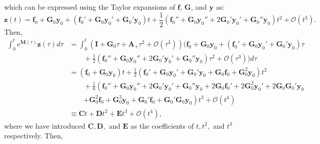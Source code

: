 which can be expressed using the Taylor expansions of $\mathbf{f}$, $\mathbf{G}$, and $\mathbf{y}$ as:
\begin{equation}
    \mathbf{z}(t) = \mathbf{f}_0 + \mathbf{G}_0\mathbf{y}_0 + \left(\mathbf{f}_0'+\mathbf{G}_0\mathbf{y}_0'+\mathbf{G}_0'\mathbf{y}_0\right)t + \frac{1}{2}\left(\mathbf{f}_0''+\mathbf{G}_0\mathbf{y}_0'' +2\mathbf{G}_0'\mathbf{y}_0'+\mathbf{G}_0''\mathbf{y}_0\right)t^2 + \mathcal{O}(t^3).
\end{equation}
Then, 
\begin{equation}
\begin{split}
    \int_{0}^t e^{\mathbf{M}(\tau)} \mathbf{z}(\tau) d \tau & = \int_{0}^t\left(
    \mathbf{I} + \mathbf{G}_0\tau+\mathbf{A}_{+}\tau^2 + \mathcal{O}(\tau^3)\right)\biggl(\mathbf{f}_0+\mathbf{G}_0\mathbf{y}_0 + \left(\mathbf{f}_0'+\mathbf{G}_0\mathbf{y}_0'  +\mathbf{G}_0'\mathbf{y}_0\right)\tau \\
    & \qquad  +\frac{1}{2}\left(\mathbf{f}_0''+\mathbf{G}_0\mathbf{y}_0''+2\mathbf{G}_0'\mathbf{y}_0'+\mathbf{G}_0''\mathbf{y}_0\right)\tau^2 + \mathcal{O}(\tau^3)\biggr)d \tau \\
    & = \left(\mathbf{f}_0+\mathbf{G}_0\mathbf{y}_0\right)t+\frac{1}{2}\left(\mathbf{f}_0'+\mathbf{G}_0\mathbf{y}_0'+\mathbf{G}_0'\mathbf{y}_0+\mathbf{G}_0\mathbf{f}_0+\mathbf{G}_0^2\mathbf{y}_0\right)t^2 \\
    & \qquad +\frac{1}{6}\left(\mathbf{f}_0'' +\mathbf{G}_0\mathbf{y}_0'' +2\mathbf{G}_0'\mathbf{y}_0'+\mathbf{G}_0''\mathbf{y}_0 +2\mathbf{G}_0\mathbf{f}_0'+2\mathbf{G}_0^2\mathbf{y}_0'+2\mathbf{G}_0\mathbf{G}_0'\mathbf{y}_0 \right. \\
    & \qquad \left. +\mathbf{G}_0^2\mathbf{f}_0 +\mathbf{G}_0^3\mathbf{y}_0 +\mathbf{G}_0'\mathbf{f}_0+\mathbf{G}_0'\mathbf{G}_0\mathbf{y}_0\right)t^3 + \mathcal{O}(t^4) \\
    & \equiv \mathbf{C}t + \mathbf{D}t^2 + \mathbf{E}t^3 + \mathcal{O}(t^4),
\end{split}
\end{equation}
where we have introduced $\mathbf{C}, \mathbf{D},$ and $\mathbf{E}$ as the coefficients of $t, t^2,$ and $t^3$ respectively. Then,
